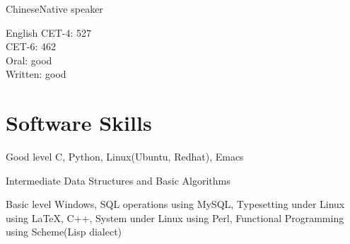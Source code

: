 \documentclass{tccv}
\begin{document}
\begin{factlist}
\item{Chinese}{Native speaker}
\item{English}{
    CET-4: 527\\
    CET-6: 462\\
    Oral: good\\
    Written: good}
\end{factlist}

\section{Software Skills}

\begin{factlist}

\item{Good level}
  {C, Python, Linux(Ubuntu, Redhat), Emacs}

\item{Intermediate}
  {Data Structures and Basic Algorithms}

\item{Basic level}
  {Windows, \newline
    SQL operations using MySQL, \newline
    Typesetting under Linux using \LaTeX, \newline
    C++, \newline
    System under Linux using Perl, \newline
    Functional Programming using Scheme(Lisp dialect)}

\end{factlist}
\end{document}
